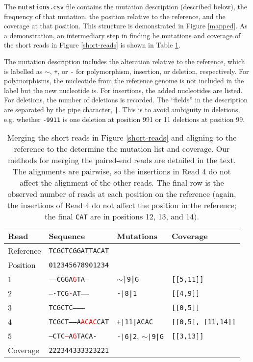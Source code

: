 \documentclass{article}
\begin{document}
The \texttt{mutations.csv} file contains the mutation description (described below), the frequency of that mutation, the position relative to the reference, and the coverage at that position.
This structure is demonstrated in Figure \ref{mapped}.
As a demonstration, an intermediary step in finding he mutations and coverage of the short reads in Figure \ref{short-reads} is shown in Table \ref{aligned}.


The mutation description includes the alteration relative to the reference, which is labelled as \texttt{$\sim$}, \texttt{+}, or \texttt{-} for polymorphism, insertion, or deletion, respectively.
For polymorphisms, the nucleotide from the reference genome is not included in the label but the new nucleotide is.
For insertions, the added nucleotides are listed.
For deletions, the number of deletions is recorded.
The ``fields'' in the description are separated by the pipe character, \texttt{|}.
This is to avoid ambiguity in deletions, e.g. whether \texttt{-9911} is one deletion at position 991 or 11 deletions at position 99.

\begin{table}[h!]
\begin{tabular}{llll}
Read & Sequence & Mutations & Coverage \\\hline
Reference & \texttt{TCGCTCGGATTACAT} &  &  \\
Position & \texttt{012345678901234} && \\\hline
1         & \texttt{-----CGGA\textcolor{red}{G}TA---} & \texttt{$\sim$|9|G} & \texttt{[[5,11]]}\\
2         & \texttt{----TCG\textcolor{red}{-}AT-----} & \texttt{-|8|1} & \texttt{[[4,9]]}\\
3         & \texttt{TCGCTC---------} & & \texttt{[[0,5]]}\\
4         & \texttt{TCGCT------A\textcolor{red}{ACAC}CAT} & \texttt{+|11|ACAC} & \texttt{[[0,5], [11,14]]}\\
5         & \texttt{---CTC\textcolor{red}{--}A\textcolor{red}{G}TACA-} & \texttt{-|6|2}, \texttt{$\sim$|9|G}& \texttt{[[3,13]]}\\\hline
Coverage & \texttt{222344333323221} &&
\end{tabular}
\caption{Merging the short reads in Figure \ref{short-reads} and aligning to the reference to the determine the mutation list and coverage.
Our methods for merging the paired-end reads are detailed in the text.
The alignments are pairwise, so the insertions in Read 4 do not affect the alignment of the other reads.
The final row is the observed number of reads at each position on the reference (again, the insertions of Read 4 do not affect the position in the reference; the final \texttt{CAT} are in positions 12, 13, and 14).}
\label{aligned}
\end{table}
\end{document}
